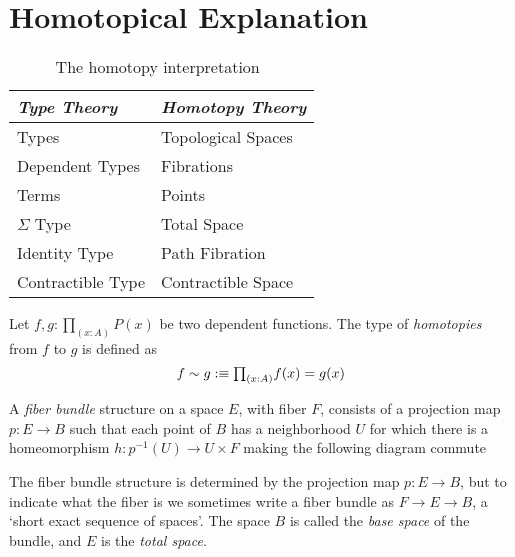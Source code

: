 \section{Homotopical Explanation}\label{sec:homotopy}


\begin{table}[H]
    \centering
    \begin{tabular}{ll}
        \hline
        \emph{Type Theory} & \emph{Homotopy Theory} \\
        \hline
        Types              & Topological Spaces     \\
        Dependent Types    & Fibrations             \\
        Terms              & Points                 \\
        $\Sigma$ Type      & Total Space            \\
        Identity Type      & Path Fibration         \\
        Contractible Type  & Contractible Space     \\
        \hline
    \end{tabular}
    \caption{The homotopy interpretation~\cite{rijke2022introductionhomotopytypetheory}}\label{tab:homotopy-interp}
\end{table}

\begin{definition}
    Let $f,g:\prod_{(x:A)}P(x)$ be two dependent functions.
    The type of \emph{homotopies} from $f$ to $g$ is defined as
    \[
        f\sim g:\equiv \textstyle\mathbf{\prod}_{(x:A)}f(x)=g(x)
    \]
\end{definition}

\begin{definition}
    A \emph{fiber bundle} structure on a space $E$, with fiber $F$, consists of a projection map $p: E\to B$ such that each point of $B$ has a neighborhood $U$ for which there is a
    homeomorphism $h:p^{-1}(U)\to U\times F$ making the following diagram commute
    \begin{figure}
    \end{figure}
\end{definition}

The fiber bundle structure is determined by the projection map $p:E\to B$,
but to indicate what the fiber is we sometimes write a fiber bundle as $F\to E\to B$,
a `short  exact sequence of spaces'.
The space $B$ is called the \emph{base space} of the bundle, and $E$ is the \emph{total space}.

